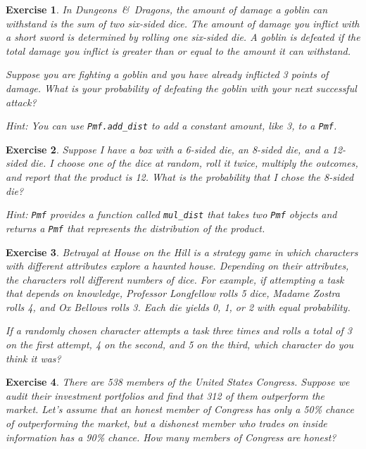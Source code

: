 \documentclass[12pt]{book}
\theoremstyle{exercise}
\newtheorem{exercise}{Exercise}[chapter]
\newcommand{\py}[1]{{\tt #1}}%
\begin{document}
\begin{exercise}
In {\it Dungeons~\&~Dragons}, the amount of damage a goblin can withstand is the sum of two six-sided dice. The amount of damage you inflict with a short sword is determined by rolling one six-sided die.
A goblin is defeated if the total damage you inflict is greater than or equal to the amount it can withstand.

Suppose you are fighting a goblin and you have already inflicted 3 points of damage. What is your probability of defeating the goblin with your next successful attack?

Hint: You can use \py{Pmf.add_dist} to add a constant amount, like 3, to a \py{Pmf}.
\end{exercise}


\begin{exercise}
Suppose I have a box with a 6-sided die, an 8-sided die, and a 12-sided die.
I choose one of the dice at random, roll it twice, multiply the outcomes, and report that the product is 12.
What is the probability that I chose the 8-sided die?

Hint: \py{Pmf} provides a function called \py{mul_dist} that takes two \py{Pmf} objects and returns a \py{Pmf} that represents the distribution of the product.
\end{exercise}


\begin{exercise}
{\it Betrayal at House on the Hill} is a strategy game in which characters with different attributes explore a haunted house.  Depending on their attributes, the characters roll different numbers of dice.  For example, if attempting a task that depends on knowledge, Professor Longfellow rolls 5 dice, Madame Zostra rolls 4, and Ox Bellows rolls 3.  Each die yields 0, 1, or 2 with equal probability.

If a randomly chosen character attempts a task three times and rolls a total of 3 on the first attempt, 4 on the second, and 5 on the third, which character do you think it was?
\end{exercise}


\begin{exercise}
There are 538 members of the United States Congress.
Suppose we audit their investment portfolios and find that 312 of them outperform the market.
Let's assume that an honest member of Congress has only a 50\% chance of outperforming the market, but a dishonest member who trades on inside information has a 90\% chance.  How many members of Congress are honest?
\end{exercise}
\end{document}
